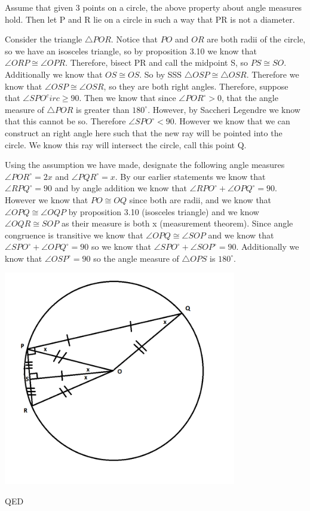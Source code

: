 \documentclass[12pt,letterpaper]{article}
\newcommand{\QED}{\begin{flushright}QED\end{flushright}}
\begin{document}
Assume that given 3 points on a circle, the above property about angle measures hold.  Then let P and R lie on a circle in such a way that PR is not a diameter. 

Consider the triangle $\triangle POR$.  Notice that $PO$ and $OR$ are both radii of the circle, so we have an isosceles triangle, so by proposition 3.10 we know that $\angle ORP \cong \angle OPR$.  Therefore, bisect PR and call the midpoint S, so $PS \cong SO$.  Additionally we know that $OS \cong OS$.  So by SSS $\triangle OSP \cong \triangle OSR$.  Therefore we know that $\angle OSP \cong \angle OSR$, so they are both right angles.  Therefore, suppose that $\angle SPO^circ \geq 90$.  Then we know that since $\angle POR^\circ > 0$, that the angle measure of $\triangle POR$ is greater than $180^\circ$.  However, by Saccheri Legendre we know that this cannot be so.   Therefore $\angle SPO^\circ < 90$. However we know that we can construct an right angle here such that the new ray will be pointed into the circle.  We know this ray will intersect the circle, call this point Q.  

Using the assumption we have made, designate the following angle measures $\angle POR^\circ = 2x$ and $\angle PQR^\circ = x$.   By our earlier statements we know that $\angle RPQ^\circ = 90$ and by angle addition we know that $\angle RPO^\circ + \angle OPQ^\circ = 90$.  However we know that $PO \cong OQ$ since both are radii, and we know that $\angle OPQ \cong \angle OQP$ by proposition 3.10 (isosceles triangle) and we know $\angle OQR \cong SOP$ as their measure is both x (measurement theorem). Since angle congruence is transitive we know that $\angle OPQ \cong \angle SOP$ and we know that $\angle SPO^\circ + \angle OPQ^\circ = 90$ so we know that $\angle SPO^\circ + \angle SOP^\circ = 90$.  Additionally we know that $\angle OSP ^\circ = 90$ so the angle measure of $\triangle OPS$ is $180^\circ$. 

\begin{center}
\includegraphics[width=4in]{hw5_prob9.png}
\end{center}
\QED
\end{document}
